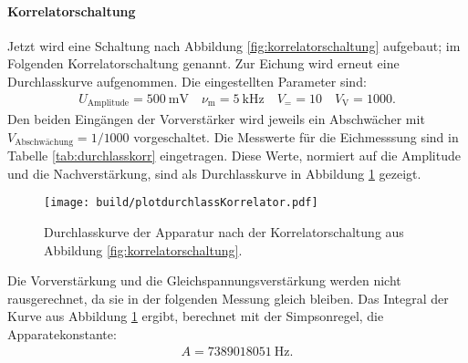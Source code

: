 \paragraph{Korrelatorschaltung}

Jetzt wird eine Schaltung nach Abbildung \ref{fig:korrelatorschaltung} aufgebaut; im Folgenden Korrelatorschaltung genannt. Zur Eichung wird erneut eine Durchlasskurve aufgenommen. Die eingestellten Parameter sind:
\begin{align*}
  U_\text{Amplitude} = \SI{500}{\milli\volt} \quad \nu_\text{m} = \SI{5}{\kilo\hertz}\quad V_= = 10 \quad V_\text{V} = 1000.
\end{align*}
Den beiden Eingängen der Vorverstärker wird jeweils ein Abschwächer mit $V_\text{Abschwächung} = 1/1000$ vorgeschaltet.
Die Messwerte für die Eichmesssung sind in Tabelle \ref{tab:durchlasskorr} eingetragen.
Diese Werte, normiert auf die Amplitude und die Nachverstärkung, sind als Durchlasskurve in Abbildung \ref{fig:plotdurchlasskorr} gezeigt.
\begin{figure}
  \centering
  \texttt{[image: build/plotdurchlassKorrelator.pdf]}
  \caption{Durchlasskurve der Apparatur nach der Korrelatorschaltung aus Abbildung \ref{fig:korrelatorschaltung}.}
  \label{fig:plotdurchlasskorr}
\end{figure}
Die Vorverstärkung und die Gleichspannungsverstärkung werden nicht rausgerechnet, da sie in der folgenden Messung gleich bleiben. Das Integral der Kurve aus Abbildung \ref{fig:plotdurchlasskorr} ergibt, berechnet mit der Simpsonregel, die Apparatekonstante:
\begin{align}
  A = \SI{7389018051}{\hertz}.
\end{align}

